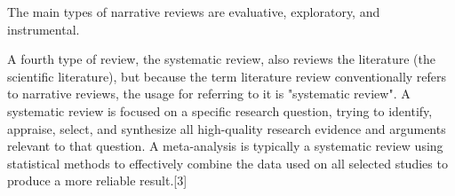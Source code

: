 The main types of narrative reviews are evaluative, exploratory, and instrumental.

A fourth type of review, the systematic review, also reviews the literature (the scientific literature), but because the term literature review conventionally refers to narrative reviews, the usage for referring to it is "systematic review". A systematic review is focused on a specific research question, trying to identify, appraise, select, and synthesize all high-quality research evidence and arguments relevant to that question. A meta-analysis is typically a systematic review using statistical methods to effectively combine the data used on all selected studies to produce a more reliable result.[3]

